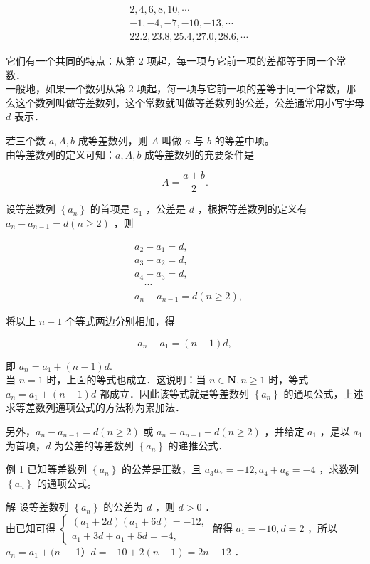 \documentclass[10pt]{article}
\begin{document}
\[
\begin{aligned}
& 2,4,6,8,10, \cdots \\
& -1,-4,-7,-10,-13, \cdots \\
& 22.2,23.8,25.4,27.0,28.6, \cdots
\end{aligned}
\]

它们有一个共同的特点：从第 2 项起，每一项与它前一项的差都等于同一个常数．\\
一般地，如果一个数列从第 2 项起，每一项与它前一项的差等于同一个常数，那么这个数列叫做等差数列，这个常数就叫做等差数列的公差，公差通常用小写字母 \(d\) 表示．

若三个数 \(a, A, b\) 成等差数列，则 \(A\) 叫做 \(a\) 与 \(b\) 的等差中项。\\
由等差数列的定义可知：\(a, A, b\) 成等差数列的充要条件是

\[
A=\frac{a+b}{2} .
\]

设等差数列 \(\left\{a_{n}\right\}\) 的首项是 \(a_{1}\) ，公差是 \(d\) ，根据等差数列的定义有 \(a_{n}-a_{n-1}=d(n \geqslant 2)\) ，则

\[
\begin{aligned}
& a_{2}-a_{1}=d, \\
& a_{3}-a_{2}=d, \\
& a_{4}-a_{3}=d, \\
& \quad \cdots \\
& a_{n}-a_{n-1}=d(n \geqslant 2),
\end{aligned}
\]

将以上 \(n-1\) 个等式两边分别相加，得

\[
a_{n}-a_{1}=(n-1) d,
\]

即 \(a_{n}=a_{1}+(n-1) d\).\\
当 \(n=1\) 时，上面的等式也成立．这说明：当 \(n \in \mathbf{N}, n \geqslant 1\) 时，等式 \(a_{n}=a_{1}+(n-1) d\) 都成立．因此该等式就是等差数列 \(\left\{a_{n}\right\}\) 的通项公式，上述求等差数列通项公式的方法称为累加法．

另外，\(a_{n}-a_{n-1}=d(n \geqslant 2)\) 或 \(a_{n}=a_{n-1}+d(n \geqslant 2)\) ，并给定 \(a_{1}\) ，是以 \(a_{1}\) 为首项，\(d\) 为公差的等差数列 \(\left\{a_{n}\right\}\) 的递推公式．

例 1 已知等差数列 \(\left\{a_{n}\right\}\) 的公差是正数，且 \(a_{3} a_{7}=-12, a_{4}+a_{6}=-4\) ，求数列 \(\left\{a_{n}\right\}\) 的通项公式。

解 设等差数列 \(\left\{a_{n}\right\}\) 的公差为 \(d\) ，则 \(d>0\) ．\\
由已知可得 \(\left\{\begin{array}{l}\left(a_{1}+2 d\right)\left(a_{1}+6 d\right)=-12, \\ a_{1}+3 d+a_{1}+5 d=-4,\end{array}\right.\) 解得 \(a_{1}=-10, d=2\) ，所以 \(a_{n}=a_{1}+(n-\) 1）\(d=-10+2(n-1)=2 n-12\) ．
\end{document}

